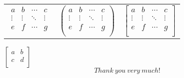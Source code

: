 \documentclass[]{ctexart} %
\begin{document}
\begin{tabular}{ccc}

$\begin{matrix}
 a & b & \cdots & c \\
 \vdots& \vdots & \ddots &\vdots \\
 e & f & \cdots & g \\
 \end{matrix}$ &


$\begin{pmatrix}
 a & b & \cdots & c \\
 \vdots& \vdots & \ddots &\vdots \\
 e & f & \cdots & g \\
 \end{pmatrix}$ &


$\begin{bmatrix}
     a &    b   & \cdots & c     \\
 \vdots& \vdots & \ddots &\vdots \\
     e &    f   & \cdots & g     \\
 \end{bmatrix}$

 \end{tabular}

$
\begin{bmatrix}
   a & b \\
   c & d \\
\end{bmatrix}
$
$$Thank~you~very~much!$$
\end{document}
